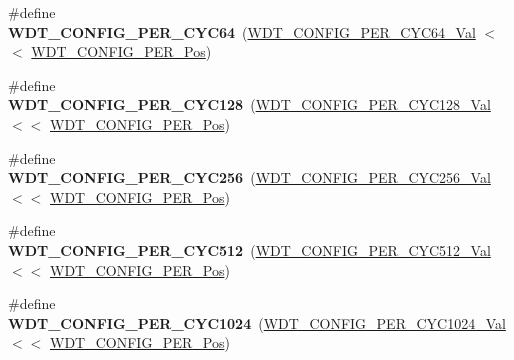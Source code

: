 \begin{DoxyCompactItemize}
\item 
\hypertarget{group___s_a_m_l21___w_d_t_gab13e7cac490e27eb54ffba5db7444743}{}\#define {\bfseries W\+D\+T\+\_\+\+C\+O\+N\+F\+I\+G\+\_\+\+P\+E\+R\+\_\+\+C\+Y\+C64}~(\hyperlink{group___s_a_m_l21___w_d_t_gaed410571015c1d792431f3c6e3503222}{W\+D\+T\+\_\+\+C\+O\+N\+F\+I\+G\+\_\+\+P\+E\+R\+\_\+\+C\+Y\+C64\+\_\+\+Val}      $<$$<$ \hyperlink{group___s_a_m_l21___w_d_t_ga55662a2fa7e16fd6cc7a5e0800034360}{W\+D\+T\+\_\+\+C\+O\+N\+F\+I\+G\+\_\+\+P\+E\+R\+\_\+\+Pos})\label{group___s_a_m_l21___w_d_t_gab13e7cac490e27eb54ffba5db7444743}

\item 
\hypertarget{group___s_a_m_l21___w_d_t_gaa562d9a0790574668e7d1e8c1e095b24}{}\#define {\bfseries W\+D\+T\+\_\+\+C\+O\+N\+F\+I\+G\+\_\+\+P\+E\+R\+\_\+\+C\+Y\+C128}~(\hyperlink{group___s_a_m_l21___w_d_t_gaccbab206b332dddc6fa1a01729fc092f}{W\+D\+T\+\_\+\+C\+O\+N\+F\+I\+G\+\_\+\+P\+E\+R\+\_\+\+C\+Y\+C128\+\_\+\+Val}     $<$$<$ \hyperlink{group___s_a_m_l21___w_d_t_ga55662a2fa7e16fd6cc7a5e0800034360}{W\+D\+T\+\_\+\+C\+O\+N\+F\+I\+G\+\_\+\+P\+E\+R\+\_\+\+Pos})\label{group___s_a_m_l21___w_d_t_gaa562d9a0790574668e7d1e8c1e095b24}

\item 
\hypertarget{group___s_a_m_l21___w_d_t_ga73048f8717cc1a5f0225004b93b0d198}{}\#define {\bfseries W\+D\+T\+\_\+\+C\+O\+N\+F\+I\+G\+\_\+\+P\+E\+R\+\_\+\+C\+Y\+C256}~(\hyperlink{group___s_a_m_l21___w_d_t_ga97dab16547481df7f3c7a0c8b1ab5797}{W\+D\+T\+\_\+\+C\+O\+N\+F\+I\+G\+\_\+\+P\+E\+R\+\_\+\+C\+Y\+C256\+\_\+\+Val}     $<$$<$ \hyperlink{group___s_a_m_l21___w_d_t_ga55662a2fa7e16fd6cc7a5e0800034360}{W\+D\+T\+\_\+\+C\+O\+N\+F\+I\+G\+\_\+\+P\+E\+R\+\_\+\+Pos})\label{group___s_a_m_l21___w_d_t_ga73048f8717cc1a5f0225004b93b0d198}

\item 
\hypertarget{group___s_a_m_l21___w_d_t_ga32ba9e900907c1cd86dd06a79ce8eacb}{}\#define {\bfseries W\+D\+T\+\_\+\+C\+O\+N\+F\+I\+G\+\_\+\+P\+E\+R\+\_\+\+C\+Y\+C512}~(\hyperlink{group___s_a_m_l21___w_d_t_ga9d9e62b7d1fd5df1ec6e15f0546ea76b}{W\+D\+T\+\_\+\+C\+O\+N\+F\+I\+G\+\_\+\+P\+E\+R\+\_\+\+C\+Y\+C512\+\_\+\+Val}     $<$$<$ \hyperlink{group___s_a_m_l21___w_d_t_ga55662a2fa7e16fd6cc7a5e0800034360}{W\+D\+T\+\_\+\+C\+O\+N\+F\+I\+G\+\_\+\+P\+E\+R\+\_\+\+Pos})\label{group___s_a_m_l21___w_d_t_ga32ba9e900907c1cd86dd06a79ce8eacb}

\item 
\hypertarget{group___s_a_m_l21___w_d_t_ga42fcf9126d0c5b29dafe775ceecdc043}{}\#define {\bfseries W\+D\+T\+\_\+\+C\+O\+N\+F\+I\+G\+\_\+\+P\+E\+R\+\_\+\+C\+Y\+C1024}~(\hyperlink{group___s_a_m_l21___w_d_t_ga987e1fd45b91a9fbb1f543c80c8d13c4}{W\+D\+T\+\_\+\+C\+O\+N\+F\+I\+G\+\_\+\+P\+E\+R\+\_\+\+C\+Y\+C1024\+\_\+\+Val}    $<$$<$ \hyperlink{group___s_a_m_l21___w_d_t_ga55662a2fa7e16fd6cc7a5e0800034360}{W\+D\+T\+\_\+\+C\+O\+N\+F\+I\+G\+\_\+\+P\+E\+R\+\_\+\+Pos})\label{group___s_a_m_l21___w_d_t_ga42fcf9126d0c5b29dafe775ceecdc043}


\end{DoxyCompactItemize}

